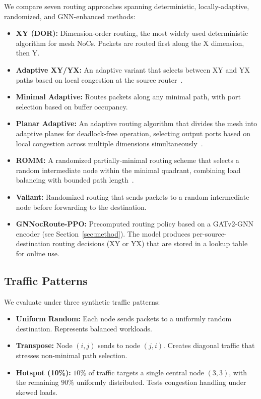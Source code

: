 We compare seven routing approaches spanning deterministic, locally-adaptive, randomized, and GNN-enhanced methods:

\begin{itemize}
    \item \textbf{XY (DOR):} Dimension-order routing, the most widely used deterministic algorithm for mesh NoCs. Packets are routed first along the X dimension, then Y.
    \item \textbf{Adaptive XY/YX:} An adaptive variant that selects between XY and YX paths based on local congestion at the source router~\cite{balfour2006}.
    \item \textbf{Minimal Adaptive:} Routes packets along any minimal path, with port selection based on buffer occupancy.
    \item \textbf{Planar Adaptive:} An adaptive routing algorithm that divides the mesh into adaptive planes for deadlock-free operation, selecting output ports based on local congestion across multiple dimensions simultaneously~\cite{chiu2000}.
    \item \textbf{ROMM:} A randomized partially-minimal routing scheme that selects a random intermediate node within the minimal quadrant, combining load balancing with bounded path length~\cite{ni1999romm}.
    \item \textbf{Valiant:} Randomized routing that sends packets to a random intermediate node before forwarding to the destination.
    \item \textbf{GNNocRoute-PPO:} Precomputed routing policy based on a GATv2-GNN encoder (see Section~\ref{sec:method}). The model produces per-source-destination routing decisions (XY or YX) that are stored in a lookup table for online use.
\end{itemize}

\subsection{Traffic Patterns}

We evaluate under three synthetic traffic patterns:

\begin{itemize}
    \item \textbf{Uniform Random:} Each node sends packets to a uniformly random destination. Represents balanced workloads.
    \item \textbf{Transpose:} Node $(i,j)$ sends to node $(j,i)$. Creates diagonal traffic that stresses non-minimal path selection.
    \item \textbf{Hotspot (10\%):} $10\%$ of traffic targets a single central node $(3,3)$, with the remaining $90\%$ uniformly distributed. Tests congestion handling under skewed loads.
\end{itemize}

